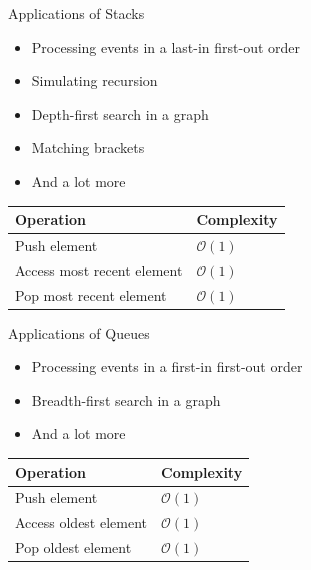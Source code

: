 \documentclass{beamer}
\begin{document}
\begin{frame}[plain]{Applications of Stacks}
    \begin{itemize}
        \item Processing events in a last-in first-out order
        \item Simulating recursion
        \item Depth-first search in a graph
        \item Matching brackets
        \item And a lot more
    \end{itemize}
    \vspace*{1cm}
    \begin{center}
    \begin{tabular}{l|l}
    Operation & Complexity \\ \hline
    Push element & $\mathcal{O}(1)$ \\
    Access most recent element & $\mathcal{O}(1)$ \\
    Pop most recent element & $\mathcal{O}(1)$ \\
    \end{tabular}
    \end{center}
\end{frame}

\begin{frame}[plain]{Applications of Queues}
    \begin{itemize}
        \item Processing events in a first-in first-out order
        \item Breadth-first search in a graph
        \item And a lot more
    \end{itemize}
    \vspace*{1cm}
    \begin{center}
    \begin{tabular}{l|l}
    Operation & Complexity \\ \hline
    Push element & $\mathcal{O}(1)$ \\
    Access oldest element & $\mathcal{O}(1)$ \\
    Pop oldest element & $\mathcal{O}(1)$ \\
    \end{tabular}
    \end{center}
\end{frame}
\end{document}
